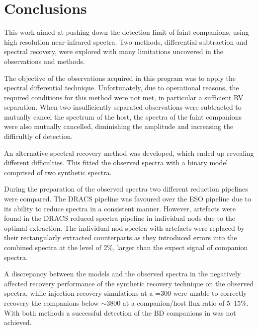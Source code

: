 
\chapter{Conclusions}  %
\label{cha:conclusions}

This work aimed at pushing down the detection limit of faint companions, using high resolution near-infrared spectra.
Two methods, differential subtraction and \textchisquared{} spectral recovery,  were explored with many limitations uncovered in the observations and methods.

The objective of the observations acquired in this program was to apply the spectral differential technique.
Unfortunately, due to operational reasons, the required conditions for this method were not met, in particular a sufficient RV separation.
When two insufficiently separated observations were subtracted to mutually cancel the spectrum of the host, the spectra of the faint companions were also mutually cancelled, diminishing the amplitude and increasing the difficultly of detection.

An alternative \textchisquared{} spectral recovery method was developed, which ended up revealing different difficulties.
This fitted the observed spectra with a binary model comprised of two synthetic spectra.

During the preparation of the observed spectra two different reduction pipelines were compared.
The {DRACS} pipeline was favoured over the {ESO} pipeline due to its ability to reduce spectra in a consistent manner.
However, artefacts were found in the {DRACS} reduced spectra pipeline in individual nods due to the optimal extraction.
The individual nod spectra with artefacts were replaced by their rectangularly extracted counterparts as they introduced errors into the combined spectra at the level of 2\%, larger than the expect signal of companion spectra.

A discrepancy between the models and the observed spectra in the \nir{} negatively affected recovery performance of the synthetic recovery technique on the observed spectra, while injection-recovery simulations at a \snr{}=300 were unable to correctly recovery the companions below \(\sim\)3800\K{} at a companion/host flux ratio of 5--15\%.
With both methods a successful detection of the {BD} companions in \nir{} was not achieved.

